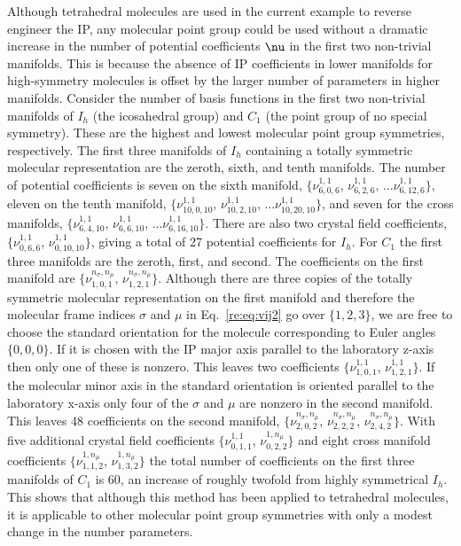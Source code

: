 \documentclass[preprint]{iucr}              %
\newcommand{\mb}[1]{\ensuremath{\mbox{\boldmath $ #1 $}}}
\begin{document}
Although tetrahedral molecules are used in the current example to
reverse engineer the IP, any molecular point group could be used
without a dramatic increase in the number of potential coefficients
$\mb{\nu}$ in the first two non-trivial manifolds. This is because
the absence of IP coefficients in lower manifolds for high-symmetry
molecules is offset by the larger number of parameters in higher
manifolds. Consider the number of basis functions in the first two
non-trivial manifolds of $I_h$
(the icosahedral group) %
and $C_1$ (the point group of no special symmetry). These are the
highest and lowest molecular point group symmetries, respectively.
The first three manifolds of $I_h$ containing a totally symmetric
molecular representation are the zeroth, sixth, and tenth manifolds.
The number of potential coefficients is seven on the sixth manifold,
$\{\nu_{6,0,6}^{1,1}$, $\nu_{6,2,6}^{1,1}$,
...$\nu_{6,12,6}^{1,1}\}$, eleven on the tenth manifold,
$\{\nu_{10,0,10}^{1,1}$, $\nu_{10,2,10}^{1,1}$,
...$\nu_{10,20,10}^{1,1}\}$, and seven for the cross manifolds,
$\{\nu_{6,4,10}^{1,1}$, $\nu_{6,6,10}^{1,1}$,
...$\nu_{6,16,10}^{1,1}\}$.  There are also two crystal field
coefficients, $\{\nu_{0,6,6}^{1,1}$, $\nu_{0,10,10}^{1,1}\}$, giving
a total of 27 potential coefficients for $I_h$.  For $C_1$ the first
three manifolds are the zeroth, first, and second. The coefficients
on the first manifold are $\{\nu_{1,0,1}^{n_\sigma,n_\mu}$,
$\nu_{1,2,1}^{n_\sigma,n_\mu}\}$. Although there are three copies of
the totally symmetric molecular representation on the first manifold
and therefore the molecular frame indices $\sigma$ and $\mu$ in
Eq.~\ref{re:eq:vij2} go over $\{1,2,3\}$, we are free to choose the
standard orientation for the molecule corresponding to Euler angles
$\{0,0,0\}$.  If it is chosen with the IP major axis parallel to the
laboratory z-axis then only one of these is nonzero. This leaves two
coefficients $\{\nu_{1,0,1}^{1,1}$, $\nu_{1,2,1}^{1,1}\}$. If the
molecular minor axis in the standard orientation is oriented
parallel to the laboratory x-axis only four of the $\sigma$ and
$\mu$ are nonzero in the second manifold. This leaves 48
coefficients on the second manifold,
$\{\nu_{2,0,2}^{n_\sigma,n_\mu}$, $\nu_{2,2,2}^{n_\sigma,n_\mu}$,
$\nu_{2,4,2}^{n_\sigma,n_\mu}\}$. With five additional crystal field
coefficients $\{\nu^{1,1}_{0,1,1}$, $\nu^{1,n_\mu}_{0,2,2}\}$ and
eight cross manifold coefficients $\{\nu^{1,n_\mu}_{1,1,2}$,
$\nu^{1,n_\mu}_{1,3,2}\}$ the total number of coefficients on the
first three manifolds of $C_1$ is 60, an increase of roughly twofold
from highly symmetrical $I_h$. This shows that although this method
has been applied to tetrahedral molecules, it is applicable to other
molecular point group symmetries with only a modest change in the
number parameters.
\end{document}
